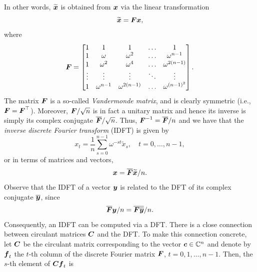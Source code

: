 In other words, \(\widetilde{\boldsymbol{x}}\) is obtained from \(\boldsymbol{x}\) via the linear transformation
\begin{equation*}
	\widetilde{\boldsymbol{x}} = \boldsymbol{F} \boldsymbol{x},
\end{equation*}
where
\begin{equation*}
	\boldsymbol{F} =
	\begin{bmatrix}
		1      & 1            & 1               & \dots  & 1                \\
		1      & \omega       & \omega^2        & \dots  & \omega^{n-1}     \\
		1      & \omega^2     & \omega^4        & \dots  & \omega^{2(n-1)}  \\
		\vdots & \vdots       & \vdots          & \ddots & \vdots           \\
		1      & \omega^{n-1} & \omega^{2(n-1)} & \dots  & \omega^{(n-1)^2}
	\end{bmatrix}.
\end{equation*}
The matrix \(\boldsymbol{F}\) is a so-called \textit{Vandermonde matrix}, and is clearly symmetric (i.e., \(\boldsymbol{F} = \boldsymbol{F}^\top\)). Moreover, \(\boldsymbol{F}/\sqrt{n}\) is in fact a unitary matrix and hence its inverse is simply its complex conjugate \(\overline{\boldsymbol{F}}/\sqrt{n}\). Thus, \(\boldsymbol{F}^{-1} = \overline{\boldsymbol{F}}/n\) and we have that the \textit{inverse discrete Fourier transform} (IDFT) is given by
\begin{equation}
	x_t = \frac{1}{n} \sum_{s=0}^{n-1} \omega^{-st} \widetilde{x}_s, \quad t = 0, \dots, n-1, \label{eq:IDFTDefinition}
\end{equation}
or in terms of matrices and vectors,
\begin{equation*}
	\boldsymbol{x} = \overline{\boldsymbol{F}} \widetilde{\boldsymbol{x}} / n.
\end{equation*}
Observe that the IDFT of a vector \(\boldsymbol{y}\) is related to the DFT of its complex conjugate \(\overline{\boldsymbol{y}}\), since
\begin{equation*}
	\overline{\boldsymbol{F}} \boldsymbol{y} / n = \overline{\boldsymbol{F} \overline{\boldsymbol{y}}} / n.
\end{equation*}
Consequently, an IDFT can be computed via a DFT.
There is a close connection between circulant matrices \(\boldsymbol{C}\) and the DFT. To make this connection concrete, let \(\boldsymbol{C}\) be the circulant matrix corresponding to the vector \(\boldsymbol{c} \in \mathbb{C}^n\) and denote by \(\boldsymbol{f}_t\) the \(t\)-th column of the discrete Fourier matrix \(\boldsymbol{F}\), \(t=0, 1, \dots, n-1\). Then, the \(s\)-th element of \(\boldsymbol{C} \boldsymbol{f}_t\) is
